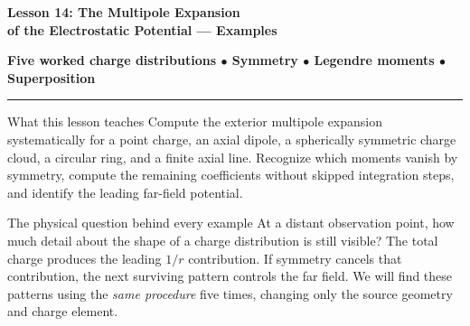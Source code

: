 \documentclass[10pt,letterpaper]{article}
\begin{document}
{\Large\bfseries\color{navy} Lesson 14: The Multipole Expansion\\of the Electrostatic Potential --- Examples}\par
{\color{teal}\bfseries Five worked charge distributions \(\bullet\) Symmetry \(\bullet\) Legendre moments \(\bullet\) Superposition}\par
\hrule\vspace{7pt}
\begin{insight}{What this lesson teaches}
Compute the exterior multipole expansion systematically for a point charge, an axial dipole, a spherically symmetric charge cloud, a circular ring, and a finite axial line. Recognize which moments vanish by symmetry, compute the remaining coefficients without skipped integration steps, and identify the leading far-field potential.
\end{insight}
\begin{insight}{The physical question behind every example}
At a distant observation point, how much detail about the shape of a charge distribution is still visible? The total charge produces the leading $1/r$ contribution. If symmetry cancels that contribution, the next surviving pattern controls the far field. We will find these patterns using the \emph{same procedure} five times, changing only the source geometry and charge element.
\end{insight}
\begin{center}
\end{center}
\end{document}
